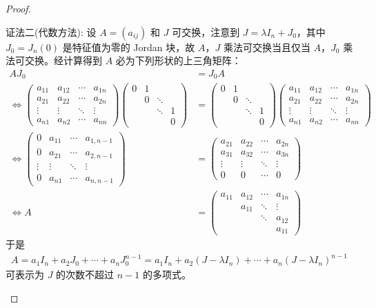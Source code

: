 \documentclass[../../main.tex]{subfiles}%
\begin{document}
\begin{proof}
\begin{enumerate}[(1)]
{\color{blue}证法二(代数方法):}
设 $A=(a_{ij})$ 和 $J$ 可交换，注意到 $J = \lambda I_n + J_0$，其中 $J_0 = J_n(0)$ 是特征值为零的 Jordan 块，故 $A$，$J$ 乘法可交换当且仅当 $A$，$J_0$ 乘法可交换。经计算得到 $A$ 必为下列形状的上三角矩阵：
\begin{align*}
AJ_0 &= J_0A \\
\Longleftrightarrow \begin{pmatrix}
a_{11} & a_{12} & \cdots & a_{1n} \\
a_{21} & a_{22} & \cdots & a_{2n} \\
\vdots & \vdots & \ddots & \vdots \\
a_{n1} & a_{n2} & \cdots & a_{nn}
\end{pmatrix} \begin{pmatrix}
0 & 1 & & \\
& 0 & \ddots & \\
& & \ddots & 1 \\
& & & 0
\end{pmatrix} &= \begin{pmatrix}
0 & 1 & & \\
& 0 & \ddots & \\
& & \ddots & 1 \\
& & & 0
\end{pmatrix} \begin{pmatrix}
a_{11} & a_{12} & \cdots & a_{1n} \\
a_{21} & a_{22} & \cdots & a_{2n} \\
\vdots & \vdots & \ddots & \vdots \\
a_{n1} & a_{n2} & \cdots & a_{nn}
\end{pmatrix} \\
\Longleftrightarrow \begin{pmatrix}
0 & a_{11} & \cdots & a_{1,n-1} \\
0 & a_{21} & \cdots & a_{2,n-1} \\
\vdots & \vdots & \ddots & \vdots \\
0 & a_{n1} & \cdots & a_{n,n-1}
\end{pmatrix} &= \begin{pmatrix}
a_{21} & a_{22} & \cdots & a_{2n} \\
a_{31} & a_{32} & \cdots & a_{3n} \\
\vdots & \vdots & \ddots & \vdots \\
0 & 0 & \cdots & 0
\end{pmatrix} \\
\Longleftrightarrow A &= \begin{pmatrix}
a_{11} & a_{12} & \cdots & a_{1n} \\
& a_{11} & \ddots & \vdots \\
& & \ddots & a_{12} \\
& & & a_{11}
\end{pmatrix}
\end{align*}
于是
\begin{align*}
A = a_1I_n + a_2J_0 + \cdots + a_nJ_0^{n - 1} = a_1I_n + a_2(J - \lambda I_n) + \cdots + a_n(J - \lambda I_n)^{n - 1}
\end{align*}
可表示为 $J$ 的次数不超过 $n - 1$ 的多项式。 


\end{enumerate}
\end{proof}
\end{document}
